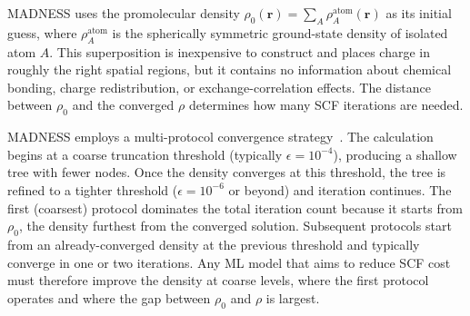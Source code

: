MADNESS uses the promolecular density $\rho_0(\mathbf{r}) = \sum_A \rho_A^\mathrm{atom}(\mathbf{r})$ as its initial guess, where $\rho_A^\mathrm{atom}$ is the spherically symmetric ground-state density of isolated atom $A$.
This superposition is inexpensive to construct and places charge in roughly the right spatial regions, but it contains no information about chemical bonding, charge redistribution, or exchange-correlation effects.
The distance between $\rho_0$ and the converged $\rho$ determines how many SCF iterations are needed.

MADNESS employs a multi-protocol convergence strategy~\cite{harrison2016madness}.
The calculation begins at a coarse truncation threshold (typically $\epsilon = 10^{-4}$), producing a shallow tree with fewer nodes.
Once the density converges at this threshold, the tree is refined to a tighter threshold ($\epsilon = 10^{-6}$ or beyond) and iteration continues.
The first (coarsest) protocol dominates the total iteration count because it starts from $\rho_0$, the density furthest from the converged solution.
Subsequent protocols start from an already-converged density at the previous threshold and typically converge in one or two iterations.
Any ML model that aims to reduce SCF cost must therefore improve the density at coarse levels, where the first protocol operates and where the gap between $\rho_0$ and $\rho$ is largest.
